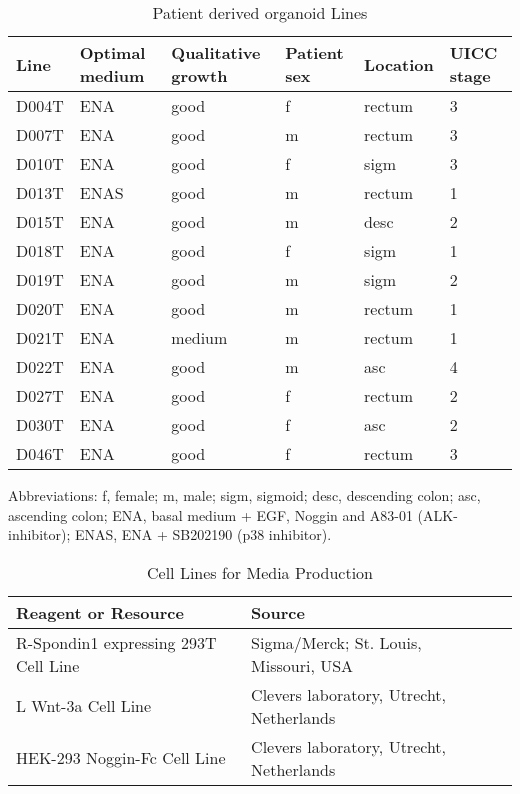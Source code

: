 \begin{flushleft}
\begin{table}[htbp]
\caption{Patient derived organoid Lines}
\label{tab:patient_organoid}
\begin{tabularx}{\textwidth}{lXXXXX}
\toprule
\textbf{Line} & \textbf{Optimal medium} & \textbf{Qualitative growth} & \textbf{Patient sex} & \textbf{Location} & \textbf{UICC stage} \\
\midrule
D004T & ENA & good & f & rectum & 3 \\
D007T & ENA & good & m & rectum & 3 \\
D010T & ENA & good & f & sigm & 3 \\
D013T & ENAS & good & m & rectum & 1 \\
D015T & ENA & good & m & desc & 2 \\
D018T & ENA & good & f & sigm & 1 \\
D019T & ENA & good & m & sigm & 2 \\
D020T & ENA & good & m & rectum & 1 \\
D021T & ENA & medium & m & rectum & 1 \\
D022T & ENA & good & m & asc & 4 \\
D027T & ENA & good & f & rectum & 2 \\
D030T & ENA & good & f & asc & 2 \\
D046T & ENA & good & f & rectum & 3 \\
\bottomrule
\end{tabularx}
\end{table}

Abbreviations: f, female; m, male; sigm, sigmoid; desc, descending colon; asc, ascending colon; ENA, basal medium + EGF, Noggin and A83-01 (ALK-inhibitor); ENAS, ENA + SB202190 (p38 inhibitor).



\begin{table}[htb]
\caption{Cell Lines for Media Production}
\label{tab:recombinant_dna} %
\begin{tabularx}{\textwidth}{Xll}
\toprule
\textbf{Reagent or Resource} & \textbf{Source}\\
\midrule
R-Spondin1 expressing 293T Cell Line & Sigma/Merck; St. Louis, Missouri, USA  \\
L Wnt-3a Cell Line & Clevers laboratory, Utrecht, Netherlands \\
HEK-293 Noggin-Fc Cell Line & Clevers laboratory, Utrecht, Netherlands \\
\bottomrule
\end{tabularx}
\end{table}




\end{flushleft}
